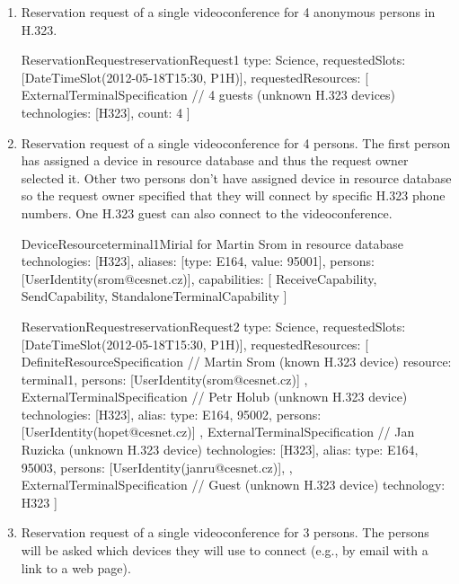 \begin{enumerate}
\item Reservation request of a single videoconference for 4 anonymous persons in H.323.

\begin{EntityExample}{ReservationRequest}{reservationRequest1}{}
type: Science,
requestedSlots: [DateTimeSlot(2012-05-18T15:30, P1H)],
requestedResources: [
  ExternalTerminalSpecification { // 4 guests (unknown H.323 devices)
    technologies: [H323],
    count: 4
  }
]
\end{EntityExample}

\item Reservation request of a single videoconference for 4 persons. The first person  has assigned a device in resource database and thus the request owner selected it. Other two persons don't have assigned device in resource database so the request owner specified that they will connect by specific H.323 phone numbers. One H.323 guest can also connect to the videoconference.

\begin{EntityExample}{DeviceResource}{terminal1}{Mirial for Martin Srom in resource database}
technologies: [H323], 
aliases: [{type: E164, value: 95001}],
persons: [UserIdentity(srom@cesnet.cz)],
capabilities: [
  ReceiveCapability, SendCapability, StandaloneTerminalCapability
]
\end{EntityExample}

\begin{EntityExample}{ReservationRequest}{reservationRequest2}{}
type: Science,
requestedSlots: [DateTimeSlot(2012-05-18T15:30, P1H)],
requestedResources: [
  DefiniteResourceSpecification { // Martin Srom (known H.323 device)
    resource: terminal1,
    persons: [UserIdentity(srom@cesnet.cz)] 
  },
  ExternalTerminalSpecification { // Petr Holub (unknown H.323 device)
    technologies: [H323],
    alias: {type: E164, 95002},
    persons: [UserIdentity(hopet@cesnet.cz)]
  },
  ExternalTerminalSpecification { // Jan Ruzicka (unknown H.323 device)
    technologies: [H323],
    alias: {type: E164, 95003},
    persons: [UserIdentity(janru@cesnet.cz)], 
  },
  ExternalTerminalSpecification { // Guest (unknown H.323 device)
    technology: H323
  }
]
\end{EntityExample}

\item Reservation request of a single videoconference for 3 persons. The persons will be asked which devices they will use to connect (e.g., by email with a link to a web page).


\end{enumerate}
